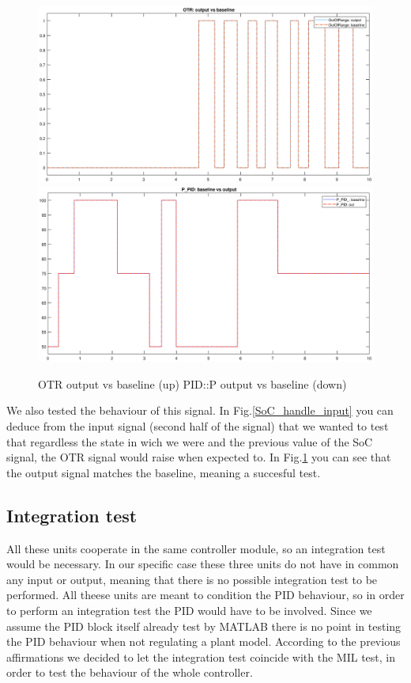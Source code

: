 \documentclass[12pt,a4paper]{report}
\begin{document}
\begin{figure}[!hbt]
	\centering
	\includegraphics[scale=0.4]{OTR_baseline_result.eps}\hfill
	\includegraphics[scale=0.4]{PidP_baseline_result.eps}
	\caption{OTR output vs baseline (up) PID::P output vs baseline (down)}
	\label{OTR_baseline_result}
\end{figure}
We also tested the behaviour of this signal. In Fig.\ref{SoC_handle_input} you can deduce from the input signal (second half of the signal) that we wanted to test that regardless the state in wich we were and the previous value of the SoC signal, the OTR signal would raise when expected to.
In Fig.\ref{OTR_baseline_result} you can see that the output signal matches the baseline, meaning a succesful test.
\FloatBarrier
\subsection{Integration test}
All these units cooperate in the same controller module, so an integration test would be necessary. In our specific case these three units do not have in common any input or output, meaning that there is no possible integration test to be performed. All theese units are meant to condition the PID behaviour, so in order to perform an integration test the PID would have to be involved. Since we assume the PID block itself already test by MATLAB there is no point in testing the PID behaviour when not regulating a plant model.
According to the previous affirmations we decided to let the integration test coincide with the MIL test, in order to test the behaviour of the whole controller.
\end{document}
